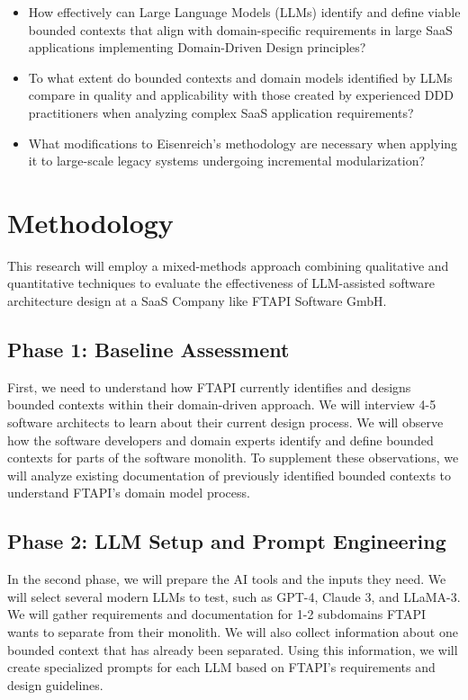 \documentclass[12pt,a4paper]{article}
\begin{document}
\begin{itemize}
    \item How effectively can Large Language Models (LLMs) identify and define viable bounded contexts that align with domain-specific requirements in large SaaS applications implementing Domain-Driven Design principles?
    \item To what extent do bounded contexts and domain models identified by LLMs compare in quality and applicability with those created by experienced DDD practitioners when analyzing complex SaaS application requirements?
    \item What modifications to Eisenreich's methodology are necessary when applying it to large-scale legacy systems undergoing incremental modularization?
\end{itemize}



\section{Methodology}
This research will employ a mixed-methods approach combining qualitative and quantitative techniques to evaluate the effectiveness of LLM-assisted software architecture design at a SaaS Company like FTAPI Software GmbH.

\subsection{Phase 1: Baseline Assessment}
First, we need to understand how FTAPI currently identifies and designs bounded contexts within their domain-driven approach. We will interview 4-5 software architects to learn about their current design process. We will observe how the software developers and domain experts identify and define bounded contexts for parts of the software monolith. To supplement these observations, we will analyze existing documentation of previously identified bounded contexts to understand FTAPI's domain model process.

\subsection{Phase 2: LLM Setup and Prompt Engineering}
In the second phase, we will prepare the AI tools and the inputs they need. We will select several modern LLMs to test, such as GPT-4, Claude 3, and LLaMA-3. We will gather requirements and documentation for 1-2 subdomains FTAPI wants to separate from their monolith. We will also collect information about one bounded context that has already been separated. Using this information, we will create specialized prompts for each LLM based on FTAPI's requirements and design guidelines.
\end{document}
